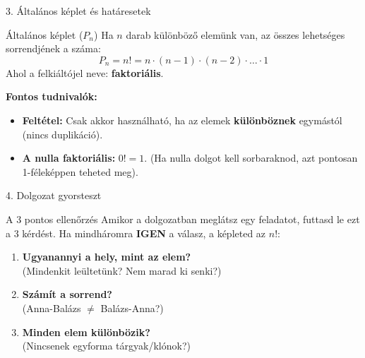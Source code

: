 \documentclass{beamer}
\begin{document}
\begin{frame}{3. Általános képlet és határesetek}
    \begin{block}{Általános képlet ($P_n$)}
        Ha $n$ darab különböző elemünk van, az összes lehetséges sorrendjének a száma:
        $$P_n = n! = n \cdot (n - 1) \cdot (n - 2) \cdot \dots \cdot 1$$
        Ahol a felkiáltójel neve: \textbf{faktoriális}.
    \end{block}

    \vspace{0.3cm}
    \textbf{Fontos tudnivalók:}
    \begin{itemize}
        \item \textbf{Feltétel:} Csak akkor használható, ha az elemek \textbf{különböznek} egymástól (nincs duplikáció).
        \item \textbf{A nulla faktoriális:} $0! = 1$. (Ha nulla dolgot kell sorbaraknod, azt pontosan 1-féleképpen teheted meg).
    \end{itemize}
\end{frame}

\begin{frame}{4. Dolgozat gyorsteszt}
    \begin{alertblock}{A 3 pontos ellenőrzés}
        Amikor a dolgozatban meglátsz egy feladatot, futtasd le ezt a 3 kérdést. Ha mindháromra \textbf{IGEN} a válasz, a képleted az $n!$:
    \end{alertblock}

    \begin{enumerate}
        \item \textbf{Ugyanannyi a hely, mint az elem?} \\ (Mindenkit leültetünk? Nem marad ki senki?)
        \item \textbf{Számít a sorrend?} \\ (Anna-Balázs $\neq$ Balázs-Anna?)
        \item \textbf{Minden elem különbözik?} \\ (Nincsenek egyforma tárgyak/klónok?)
    \end{enumerate}
\end{frame}
\end{document}
